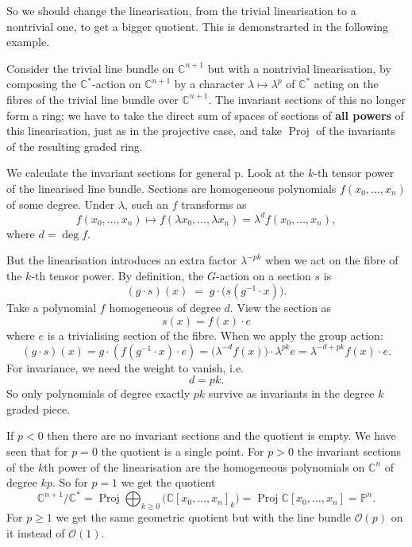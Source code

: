 \documentclass[12pt]{article}
\begin{document}
So we should change the linearisation, from the trivial linearisation to a nontrivial one, to get a bigger quotient. This is demonstrarted in the following example.

\begin{example}
  Consider the trivial line bundle on $\mathbb{C}^{n+1}$ but with a nontrivial
  linearisation, by composing the $\mathbb{C}^*$-action on $\mathbb{C}^{n+1}$ by a character
  $\lambda \mapsto \lambda^{p}$ of $\mathbb{C}^*$ acting on the fibres of the trivial line
  bundle over $\mathbb{C}^{n+1}$. The invariant sections of this no longer form a ring; we
  have to take the direct sum of spaces of sections of \textbf{all powers} of this linearisation,
  just as in the projective case, and take $\operatorname{Proj}$ of the invariants of the
  resulting graded ring.

  We calculate the invariant sections for general p. Look at the $k$-th tensor power of the linearised line bundle. Sections are homogeneous polynomials $f(x_0,\dots,x_n)$ of some degree. Under $\lambda$, such an $f$ transforms as
  \[
    f(x_0,\dots,x_n) \mapsto f(\lambda x_0,\dots,\lambda x_n) = \lambda^d f(x_0,\dots,x_n),
  \]
  where $d=\deg f$.

  But the linearisation introduces an extra factor $\lambda^{-pk}$ when we act on the fibre of the $k$-th tensor power. By definition, the $G$-action on a section $s$ is
  \[
    (g\cdot s)(x) \;=\; g\cdot \big(s(g^{-1}\cdot x)\big).
  \]
  Take a polynomial $f$ homogeneous of degree $d$. View the section as
  \[s(x) = f(x)\cdot e\]
  where $e$ is a trivialising section of the fibre. When we apply the group action:
  \[
    (g\cdot s)(x) = g\cdot(f(g^{-1}\cdot x)\cdot e)
    = \big(\lambda^{-d} f(x)\big)\cdot \lambda^{pk} e
    = \lambda^{-d+pk} f(x)\cdot e.
  \]
  For invariance, we need the weight to vanish, i.e.
  \[
    d = pk.
  \]
  So only polynomials of degree exactly $pk$ survive as invariants in the degree $k$ graded piece.

  If $p<0$ then there are no invariant sections and the quotient is empty. We have seen that
  for $p=0$ the quotient is a single point. For $p>0$ the invariant sections of the $k$th
  power of the linearisation are the homogeneous polynomials on $\mathbb{C}^n$ of degree $kp$.
  So for $p=1$ we get the quotient
  \begin{equation}
    \mathbb{C}^{n+1}/\mathbb{C}^*
    = \operatorname{Proj} \bigoplus_{k\ge 0} \big(\mathbb{C}[x_0,\dots,x_n]_k\big)
    = \operatorname{Proj} \mathbb{C}[x_0,\dots,x_n] = \mathbb{P}^n.
  \end{equation}
  For $p\ge 1$ we get the same geometric quotient but with the line bundle
  $\mathcal{O}(p)$ on it instead of $\mathcal{O}(1)$.


\end{example}
\end{document}
